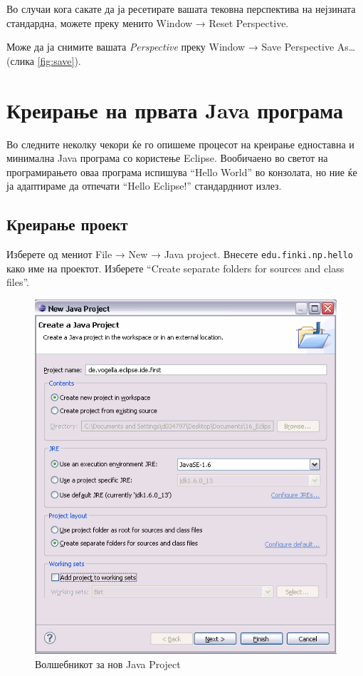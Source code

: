 Во случаи кога сакате да ја ресетирате вашата тековна перспектива на нејзината
стандардна, можете преку менито Window → Reset Perspective.

Може да ја снимите вашата \emph{Perspective} преку Window → Save Perspective
As\ldots{} (слика \ref{fig:save}).

\section{Креирање на првата Java програма}

Во следните неколку чекори ќе го опишеме процесот на креирање едноставна и
минимална Java програма со користење Eclipse. Вообичаено во светот на
програмирањето оваа програма испишува ``Hello World'' во конзолата, но ние ќе ја
адаптираме да отпечати ``Hello Eclipse!'' стандардниот излез.

\subsection{Креирање проект}

Изберете од мениот File → New → Java project. Внесете
\texttt{edu.finki.np.hello} како име на проектот. Изберете ``Create separate folders for sources and class files''.

\begin{figure}
\centering
\includegraphics[scale=.5]{images/project}
\caption{Волшебникот за нов Java Project}
\end{figure}

